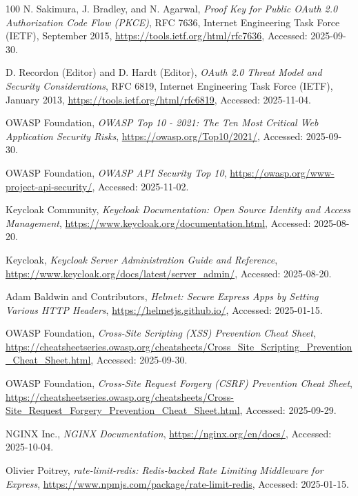 \begin{thebibliography}{100}
  N. Sakimura, J. Bradley, and N. Agarwal,
  \textit{Proof Key for Public OAuth 2.0 Authorization Code Flow (PKCE)},
  RFC 7636, Internet Engineering Task Force (IETF), September 2015,
  \url{https://tools.ietf.org/html/rfc7636}, Accessed: 2025-09-30.

  D. Recordon (Editor) and D. Hardt (Editor),
  \textit{OAuth 2.0 Threat Model and Security Considerations},
  RFC 6819, Internet Engineering Task Force (IETF), January 2013,
  \url{https://tools.ietf.org/html/rfc6819}, Accessed: 2025-11-04.

  OWASP Foundation,
  \textit{OWASP Top 10 - 2021: The Ten Most Critical Web Application Security Risks},
  \url{https://owasp.org/Top10/2021/}, Accessed: 2025-09-30.

  OWASP Foundation,
  \textit{OWASP API Security Top 10},
  \url{https://owasp.org/www-project-api-security/}, Accessed: 2025-11-02.

  Keycloak Community,
  \textit{Keycloak Documentation: Open Source Identity and Access Management},
  \url{https://www.keycloak.org/documentation.html}, Accessed: 2025-08-20.

  Keycloak,
  \textit{Keycloak Server Administration Guide and Reference},
  \url{https://www.keycloak.org/docs/latest/server_admin/}, Accessed: 2025-08-20.

  Adam Baldwin and Contributors,
  \textit{Helmet: Secure Express Apps by Setting Various HTTP Headers},
  \url{https://helmetjs.github.io/}, Accessed: 2025-01-15.

  OWASP Foundation,
  \textit{Cross-Site Scripting (XSS) Prevention Cheat Sheet},
  \url{https://cheatsheetseries.owasp.org/cheatsheets/Cross_Site_Scripting_Prevention_Cheat_Sheet.html}, Accessed: 2025-09-30.

  OWASP Foundation,
  \textit{Cross-Site Request Forgery (CSRF) Prevention Cheat Sheet},
  \url{https://cheatsheetseries.owasp.org/cheatsheets/Cross-Site_Request_Forgery_Prevention_Cheat_Sheet.html}, Accessed: 2025-09-29.

  NGINX Inc.,
  \textit{NGINX Documentation},
  \url{https://nginx.org/en/docs/}, Accessed: 2025-10-04.

  Olivier Poitrey,
  \textit{rate-limit-redis: Redis-backed Rate Limiting Middleware for Express},
  \url{https://www.npmjs.com/package/rate-limit-redis}, Accessed: 2025-01-15.


\end{thebibliography}
